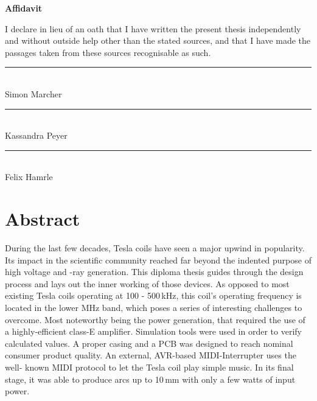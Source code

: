 \newpage
\mbox{}
\newpage

\begin{center}
\textbf{\huge Affidavit}
\end{center}


\vspace*{2cm}
\begin{center}
\begin{minipage}{0.9\textwidth}
\begin{center}
I declare in lieu of an oath that I have written the present thesis independently and without outside help other than the stated sources, and that I have made the passages taken from these sources recognisable as such.
\end{center}
\end{minipage}
\end{center}


\vfill

\parbox{\textwidth}{
    \parbox{4cm}{
      \centering
      \rule{4cm}{1pt}\\
    Simon Marcher
    }
    \hfill
    \parbox{4cm}{
      \centering
      \rule{4cm}{1pt}\\
      Kassandra Peyer
    }
    \hfill
    \parbox{4cm}{
      \centering
      \rule{4cm}{1pt}\\
      Felix Hamrle
    }
}

\newpage
\mbox{}
\newpage

\chapter*{Abstract}

During the last few decades, Tesla coils have seen a major upwind in popularity. Its impact in the scientific community reached far beyond the indented purpose of high voltage and -ray generation. This diploma thesis guides through the design process and lays out the inner working of those devices. As opposed to most existing Tesla coils operating at 100 \hspace{10pt}- 500\,kHz, this coil's operating frequency is located in the lower MHz band, which poses a series of interesting challenges to overcome. Most noteworthy being the power generation, that required the use of a highly-efficient class-E amplifier. Simulation tools were used \hspace{10pt}in order to verify calculated values. A proper casing and a PCB was designed to reach nominal consumer product quality. An external, AVR-based MIDI-Interrupter uses the well- known MIDI protocol to let the Tesla coil play simple music. In its final stage, it was able to produce arcs up to 10\,mm with only a few watts of input power.

